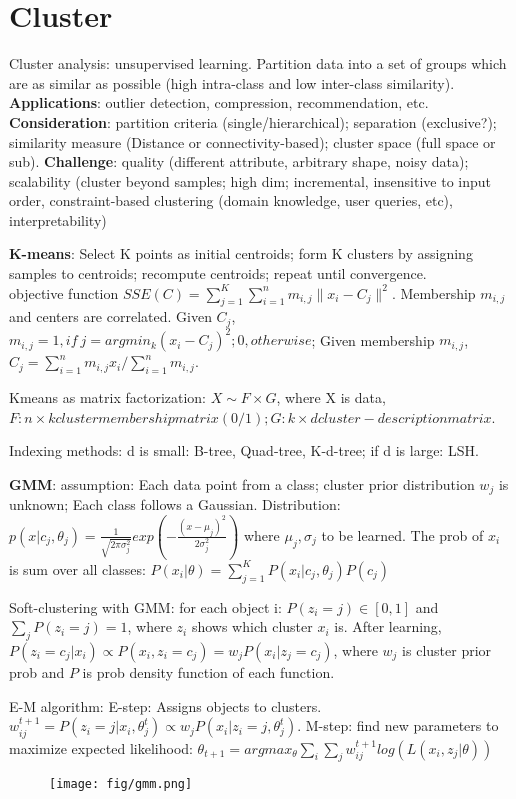 \documentclass[10pt,twocolumn]{article}
\begin{document}
\section{Cluster}
Cluster analysis: unsupervised learning. Partition data into a set of groups which are as similar as possible (high intra-class and low inter-class similarity). \textbf{Applications}: outlier detection, compression, recommendation, etc. \textbf{Consideration}: partition criteria (single/hierarchical); separation (exclusive?); similarity measure (Distance or connectivity-based); cluster space (full space or sub). \textbf{Challenge}: quality (different attribute, arbitrary shape, noisy data); scalability (cluster beyond samples; high dim; incremental, insensitive to input order, constraint-based clustering (domain knowledge, user queries, etc), interpretability)

\textbf{K-means}: Select K points as initial centroids; form K clusters by assigning samples to centroids; recompute centroids; repeat until convergence.\\ 
objective function $SSE(C)=\sum_{j=1}^K\sum_{i=1}^nm_{i,j}\|x_i-C_j\|^2$. Membership $m_{i,j}$ and centers are correlated. Given $C_j$, $m_{i,j}=1, if\ j=argmin_k(x_i-C_j)^2;0,otherwise$; Given membership $m_{i,j}$, $C_j=\sum_{i=1}^nm_{i,j}x_i/\sum_{i=1}^nm_{i,j}$.

Kmeans as matrix factorization: $X\sim F\times G$, where X is data, $F:n\times k cluster membership matrix(0/1); G: k\times d cluster-description matrix$. 

Indexing methods: d is small: B-tree, Quad-tree, K-d-tree; if d is large: LSH.

\textbf{GMM}: assumption: Each data point from a class; cluster prior distribution $w_j$ is unknown; Each class follows a Gaussian. Distribution: $p(x|c_j,\theta_j)=\frac{1}{\sqrt{2\pi \sigma_j^2}}exp(-\frac{(x-\mu_j)^2}{2\sigma_j^2})$ where $\mu_j,\sigma_j$ to be learned. The prob of $x_i$ is sum over all classes: $P(x_i|\theta)=\sum_{j=1}^KP(x_i|c_j,\theta_j)P(c_j)$ 

Soft-clustering with GMM: for each object i: $P(z_i=j)\in[0,1]$ and $\sum_jP(z_i=j)=1$, where $z_i$ shows which cluster $x_i$ is. After learning, $P(z_i=c_j|x_i)\varpropto P(x_i,z_i=c_j)=w_jP(x_i|z_j=c_j)$, where $w_j$ is cluster prior prob and $P$ is prob density function of each function.  

E-M algorithm: E-step: Assigns objects to clusters. $w_{ij}^{t+1}=P(z_i=j|x_i,\theta_j^t)\varpropto w_jP(x_i|z_i=j,\theta_j^t)$. M-step: find new parameters to maximize expected likelihood: $\theta_{t+1}=argmax_\theta\sum_i\sum_jw_{ij}^{t+1}log(L(x_i,z_j|\theta))$
\begin{figure}[!ht]
    \centering
    \texttt{[image: fig/gmm.png]}
\end{figure}
\end{document}
